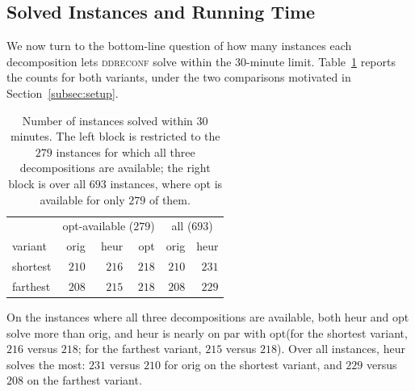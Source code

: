 \documentclass[conference]{IEEEtran}
\newcommand{\OrigDecom}{\textsf{orig}\xspace}
\newcommand{\HeurDecom}{\textsf{heur}\xspace}
\newcommand{\OptDecom}{\textsf{opt}\xspace}
\begin{document}
\subsection{Solved Instances and Running Time}
\label{subsec:solved}

We now turn to the bottom-line question of how many instances each decomposition lets
\textsc{ddreconf} solve within the $30$-minute limit.
Table~\ref{tab:solved} reports the counts for both variants, under the two
comparisons motivated in Section~\ref{subsec:setup}.

\begin{table}[t]
  \centering
  \caption{Number of instances solved within $30$ minutes. The left block is
  restricted to the $279$ instances for which all three decompositions are available; the
  right block is over all $693$ instances, where \OptDecom is available for only
  $279$ of them.}
  \label{tab:solved}
  \begin{tabular}{lrrr|rr}
    \hline
    & \multicolumn{3}{c|}{opt-available ($279$)} & \multicolumn{2}{c}{all ($693$)} \\
    variant & \OrigDecom & \HeurDecom & \OptDecom & \OrigDecom & \HeurDecom \\
    \hline
    shortest & $210$ & $216$ & $218$ & $210$ & $231$ \\
    farthest & $208$ & $215$ & $218$ & $208$ & $229$ \\
    \hline
  \end{tabular}
\end{table}

On the instances where all three decompositions are available, both \HeurDecom and
\OptDecom solve more than \OrigDecom, and \HeurDecom is nearly on par with
\OptDecom (for the shortest variant, $216$ versus $218$; for the farthest
variant, $215$ versus $218$).
Over all instances, \HeurDecom solves the most: $231$ versus $210$ for
\OrigDecom on the shortest variant, and $229$ versus $208$ on the farthest
variant.
\end{document}
